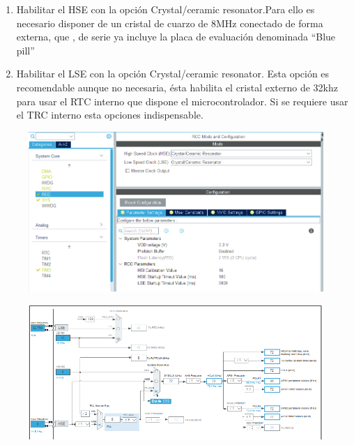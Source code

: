 \documentclass[10pt,a4paper,oneside]{article}
\begin{document}
\begin{enumerate}
	\item Habilitar el HSE con la opción Crystal/ceramic resonator.Para ello es necesario disponer de un cristal de cuarzo de 8MHz conectado de forma externa, que , de serie ya incluye la placa de evaluación denominada "`Blue pill"'    
	\item Habilitar el LSE con la opción Crystal/ceramic resonator. Esta opción es recomendable aunque no necesaria, ésta habilita el cristal externo de 32khz para usar el RTC interno que dispone el microcontrolador. Si se requiere usar el TRC interno esta opciones indispensable.  
\end{enumerate}

\begin{figure}[H]
\centering
\includegraphics[scale=0.5]{Imagenes/Clock_CFG2.png}
\caption[Configuración de la frecuencia del sistema]{ }
\label{fig:002}
\end{figure}

\begin{figure}[H]
\centering
\includegraphics[scale=0.5]{Imagenes/Clock_CFG1.png}
\caption[Configuración de la frecuencia del sistema]{ }
\label{fig:003}
\end{figure}
\end{document}
